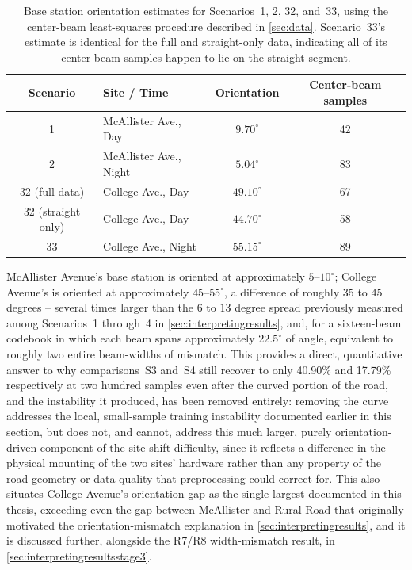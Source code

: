 \documentclass{iutbscthesis}
\begin{document}
\begin{table}[H]
    \centering
    \begin{tabular}{c l c c}
        \toprule
        Scenario & Site / Time & Orientation & Center-beam samples \\
        \midrule
        1 & McAllister Ave., Day & $9.70^\circ$ & 42 \\
        2 & McAllister Ave., Night & $5.04^\circ$ & 83 \\
        32 (full data) & College Ave., Day & $49.10^\circ$ & 67 \\
        32 (straight only) & College Ave., Day & $44.70^\circ$ & 58 \\
        33 & College Ave., Night & $55.15^\circ$ & 89 \\
        \bottomrule
    \end{tabular}
    \caption{Base station orientation estimates for Scenarios~1, 2, 32, and~33, using the center-beam least-squares procedure described in \autoref{sec:data}. Scenario~33's estimate is identical for the full and straight-only data, indicating all of its center-beam samples happen to lie on the straight segment.}
    \label{tab:collegeorientation}
\end{table}

McAllister Avenue's base station is oriented at approximately $5$--$10^\circ$; College Avenue's is oriented at approximately $45$--$55^\circ$, a difference of roughly $35$ to $45$ degrees -- several times larger than the $6$ to $13$ degree spread previously measured among Scenarios~1 through~4 in \autoref{sec:interpretingresults}, and, for a sixteen-beam codebook in which each beam spans approximately $22.5^\circ$ of angle, equivalent to roughly two entire beam-widths of mismatch. This provides a direct, quantitative answer to why comparisons~S3 and~S4 still recover to only 40.90\% and 17.79\% respectively at two hundred samples even after the curved portion of the road, and the instability it produced, has been removed entirely: removing the curve addresses the local, small-sample training instability documented earlier in this section, but does not, and cannot, address this much larger, purely orientation-driven component of the site-shift difficulty, since it reflects a difference in the physical mounting of the two sites' hardware rather than any property of the road geometry or data quality that preprocessing could correct for. This also situates College Avenue's orientation gap as the single largest documented in this thesis, exceeding even the gap between McAllister and Rural Road that originally motivated the orientation-mismatch explanation in \autoref{sec:interpretingresults}, and it is discussed further, alongside the R7/R8 width-mismatch result, in \autoref{sec:interpretingresultsstage3}.
\end{document}
